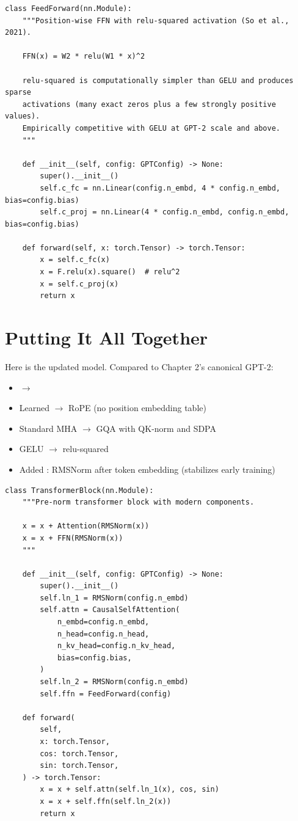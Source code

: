 \begin{lstlisting}
class FeedForward(nn.Module):
    """Position-wise FFN with relu-squared activation (So et al., 2021).

    FFN(x) = W2 * relu(W1 * x)^2

    relu-squared is computationally simpler than GELU and produces sparse
    activations (many exact zeros plus a few strongly positive values).
    Empirically competitive with GELU at GPT-2 scale and above.
    """

    def __init__(self, config: GPTConfig) -> None:
        super().__init__()
        self.c_fc = nn.Linear(config.n_embd, 4 * config.n_embd, bias=config.bias)
        self.c_proj = nn.Linear(4 * config.n_embd, config.n_embd, bias=config.bias)

    def forward(self, x: torch.Tensor) -> torch.Tensor:
        x = self.c_fc(x)
        x = F.relu(x).square()  # relu^2
        x = self.c_proj(x)
        return x
\end{lstlisting}


\section{Putting It All Together}

Here is the updated model.  Compared to Chapter 2's canonical GPT-2:
\begin{itemize}
  \item {} $\to$ 
  \item Learned  $\to$ RoPE (no position embedding table)
  \item Standard MHA $\to$ GQA with QK-norm and SDPA
  \item GELU $\to$ relu-squared
  \item Added : RMSNorm after token embedding (stabilizes early training)
\end{itemize}

\begin{lstlisting}
class TransformerBlock(nn.Module):
    """Pre-norm transformer block with modern components.

    x = x + Attention(RMSNorm(x))
    x = x + FFN(RMSNorm(x))
    """

    def __init__(self, config: GPTConfig) -> None:
        super().__init__()
        self.ln_1 = RMSNorm(config.n_embd)
        self.attn = CausalSelfAttention(
            n_embd=config.n_embd,
            n_head=config.n_head,
            n_kv_head=config.n_kv_head,
            bias=config.bias,
        )
        self.ln_2 = RMSNorm(config.n_embd)
        self.ffn = FeedForward(config)

    def forward(
        self,
        x: torch.Tensor,
        cos: torch.Tensor,
        sin: torch.Tensor,
    ) -> torch.Tensor:
        x = x + self.attn(self.ln_1(x), cos, sin)
        x = x + self.ffn(self.ln_2(x))
        return x
\end{lstlisting}

